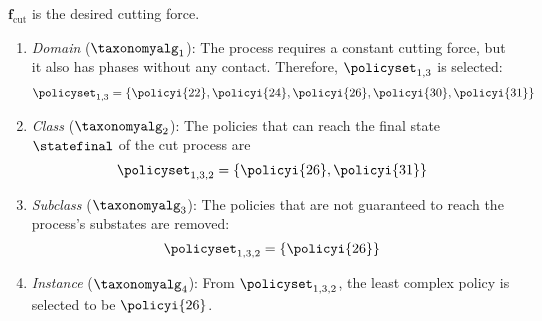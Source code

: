 $\boldsymbol{f}_\text{cut}$ is the desired cutting force.
\begin{enumerate}
    \item \emph{Domain} ($\taxonomyalg_1$): The process requires a constant cutting force, but it also has phases without any contact. Therefore, $\policyset_{1,3}$ is selected:
    \begin{equation*}
        \policyset_{1,3}=\{\policyi{22},\policyi{24},\policyi{26},\policyi{30},\policyi{31}\}
    \end{equation*}
    \item \emph{Class} ($\taxonomyalg_2$): The policies that can reach the final state $\statefinal$ of the cut process are
    \begin{equation*}
        \policyset_{1,3,2}=\{
        \policyi{26},\policyi{31}
        \}
    \end{equation*}
    \item \emph{Subclass} ($\taxonomyalg_3$): The policies that are not guaranteed to reach the process's substates are removed:
    \begin{equation*}
        \policyset_{1,3,2}=\{\policyi{26}\}
    \end{equation*}
    \item \emph{Instance} ($\taxonomyalg_4$): From $\policyset_{1,3,2}$, the least complex policy is selected to be $\policyi{26}$.
\end{enumerate}